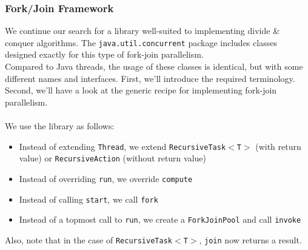 \documentclass[main.tex]{subfiles}
\begin{document}
\subsubsection{Fork/Join Framework}
We continue our search for a library well-suited to implementing divide \& conquer algorithms. The \texttt{java.util.concurrent} package includes classes designed exactly for this type of fork-join parallelism.\\
Compared to Java threads, the usage of these classes is identical, but with some different names and interfaces. First, we'll introduce the required terminology. Second, we'll have a look at the generic recipe for implementing fork-join parallelism.\\
\\
We use the library as follows:
\begin{itemize}
    \item Instead of extending \texttt{Thread}, we extend \texttt{RecursiveTask$<$T$>$} (with return value) or \texttt{RecursiveAction} (without return value)
    \item Instead of overriding \texttt{run}, we override \texttt{compute}
    \item Instead of calling \texttt{start}, we call \texttt{fork}
    \item Instead of a topmost call to \texttt{run}, we create a \texttt{ForkJoinPool} and call \texttt{invoke}
\end{itemize}
Also, note that in the case of \texttt{RecursiveTask$<$T$>$}, \texttt{join} now returns a result.\\
\end{document}
